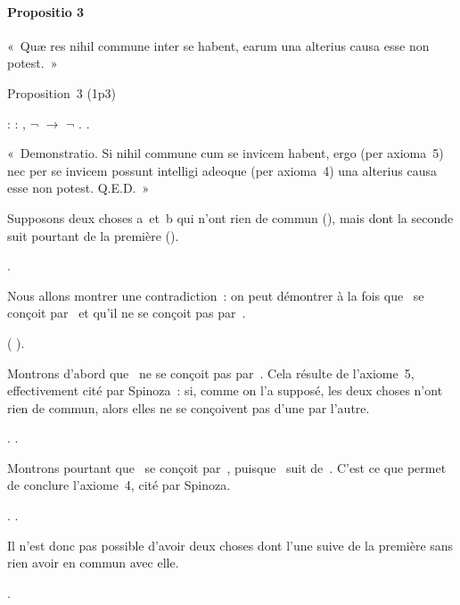 \documentclass[12pt]{report}
\begin{document}
\paragraph{Propositio 3}

 « Quæ res nihil commune inter se habent, earum una alterius causa
  esse non potest. » 

 Proposition 3 (1p3) \begin{coqdoccode}
\coqdocindent{1.00em}
 :\coqdoceol
\coqdocindent{2.00em}
\coqdockw{\ensuremath{\forall}}  : , \ensuremath{\lnot}   \ensuremath{\rightarrow} \ensuremath{\lnot}  .\coqdoceol
\coqdocemptyline
\coqdocindent{1.00em}
.\coqdoceol
\end{coqdoccode}
« Demonstratio. Si nihil commune cum se invicem habent, ergo
    (per axioma 5) nec per se invicem possunt intelligi adeoque (per
    axioma 4) una alterius causa esse non potest. Q.E.D. » 

 Supposons deux choses a et b qui n'ont rien de commun
    (), mais dont la seconde suit pourtant de la première
    (). \begin{coqdoccode}
\coqdocemptyline
\coqdocindent{2.00em}
    .\coqdoceol
\coqdocemptyline
\end{coqdoccode}
Nous allons montrer une contradiction : on peut démontrer à la
    fois que  se conçoit par  et qu'il ne se conçoit pas par .
    \begin{coqdoccode}
\coqdocemptyline
\coqdocindent{2.00em}
 (  ).\coqdoceol
\coqdocemptyline
\end{coqdoccode}
Montrons d'abord que  ne se conçoit pas par . Cela résulte
    de l'axiome 5, effectivement cité par Spinoza : si, comme on l'a
    supposé, les deux choses n'ont rien de commun, alors elles ne se
    conçoivent pas d'une par l'autre. \begin{coqdoccode}
\coqdocemptyline
\coqdocindent{2.00em}
 .  .\coqdoceol
\coqdocemptyline
\end{coqdoccode}
Montrons pourtant que  se conçoit par , puisque  suit
    de . C'est ce que permet de conclure l'axiome 4, cité par
    Spinoza. \begin{coqdoccode}
\coqdocemptyline
\coqdocindent{2.00em}
 .  .\coqdoceol
\coqdocemptyline
\end{coqdoccode}
Il n'est donc pas possible d'avoir deux choses dont l'une suive
    de la première sans rien avoir en commun avec elle. \begin{coqdoccode}
\coqdocindent{1.00em}
.\coqdoceol
\coqdocemptyline
\end{coqdoccode}
\end{document}
